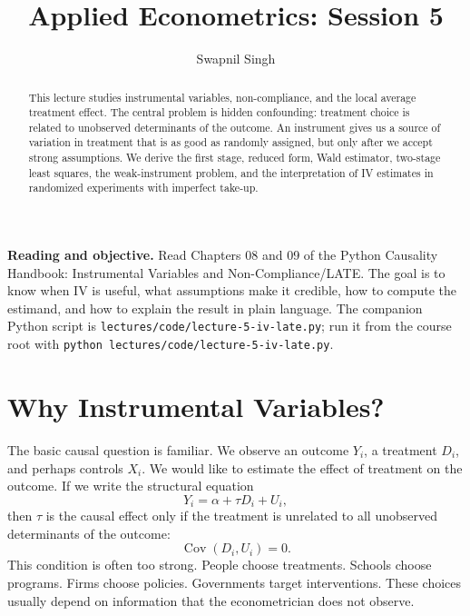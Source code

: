 

\title{Applied Econometrics: Session 5}
\author{Swapnil Singh}
\date{}


\setlength{\headheight}{26pt}

\newcommand{\Zi}{Z_i}
\newcommand{\Di}{D_i}
\newcommand{\Yi}{Y_i}
\newcommand{\Xcov}{X_i}
\newcommand{\Ui}{U_i}
\newcommand{\Vi}{V_i}
\newcommand{\Yone}{Y_i(1)}
\newcommand{\Yzero}{Y_i(0)}
\newcommand{\Done}{D_i(1)}
\newcommand{\Dzero}{D_i(0)}
\newcommand{\Covp}{\operatorname{Cov}}
\newcommand{\Corr}{\operatorname{Corr}}


\maketitle

\begin{abstract}
This lecture studies instrumental variables, non-compliance, and the local
average treatment effect. The central problem is hidden confounding: treatment
choice is related to unobserved determinants of the outcome. An instrument gives
us a source of variation in treatment that is as good as randomly assigned, but
only after we accept strong assumptions. We derive the first stage, reduced
form, Wald estimator, two-stage least squares, the weak-instrument problem, and
the interpretation of IV estimates in randomized experiments with imperfect
take-up.
\end{abstract}

\begin{boxD}
\textbf{Reading and objective.} Read Chapters 08 and 09 of the Python Causality
Handbook: Instrumental Variables and Non-Compliance/LATE. The goal is to know
when IV is useful, what assumptions make it credible, how to compute the
estimand, and how to explain the result in plain language. The companion Python
script is \texttt{lectures/code/lecture-5-iv-late.py}; run it from the course
root with \texttt{python lectures/code/lecture-5-iv-late.py}.
\end{boxD}

\section{Why Instrumental Variables?}

The basic causal question is familiar. We observe an outcome $\Yi$, a treatment
$\Di$, and perhaps controls $\Xcov$. We would like to estimate the effect of
treatment on the outcome. If we write the structural equation
\[
    \Yi = \alpha + \tau \Di + \Ui,
\]
then $\tau$ is the causal effect only if the treatment is unrelated to all
unobserved determinants of the outcome:
\[
    \Covp(\Di,\Ui)=0.
\]
This condition is often too strong. People choose treatments. Schools choose
programs. Firms choose policies. Governments target interventions. These choices
usually depend on information that the econometrician does not observe.

